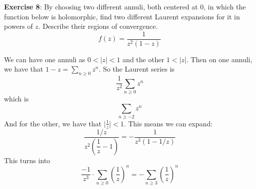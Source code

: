 \documentclass{article}
\begin{document}
\textbf{Exercise 8}: By choosing two different annuli, both centered at $0$, in which the function below is holomorphic, find two different Laurent expansions for it in powers of $z$. Describe their regions of convergence.
    \begin{equation*}
        f(z) = \dfrac{1}{z^{2}(1 - z)}
    \end{equation*}
        \begin{answer}
            We can have one annuli as $0 < \lvert z \rvert < 1$ and the other $1 < \lvert z \rvert$. Then on one annuli, we have that $1 - z = \sum_{n \geq 0}z^{n}$. So the Laurent series is
                \begin{equation*}
                    \dfrac{1}{z^{2}} \sum_{n \geq 0}z^{n}
                \end{equation*}
            which is
                \begin{equation*}
                    \sum_{n \geq -2}z^{n}
                \end{equation*}
            And for the other, we have that $\lvert \frac{1}{z} \rvert < 1$. This means we can expand:
                \begin{equation*}
                    \dfrac{1/z}{z^{2}\left(\dfrac{1}{z} - 1\right)} = -\dfrac{1}{z^{3}(1 - 1/z)}
                \end{equation*}
            This turns into
                \begin{equation*}
                    \dfrac{-1}{z^{3}} \cdot \sum_{n \geq 0}\left(\dfrac{1}{z}\right)^{n} = -\sum_{n \geq 3} \left(\dfrac{1}{z}\right)^{n}
                \end{equation*}
        \end{answer}
\end{document}
